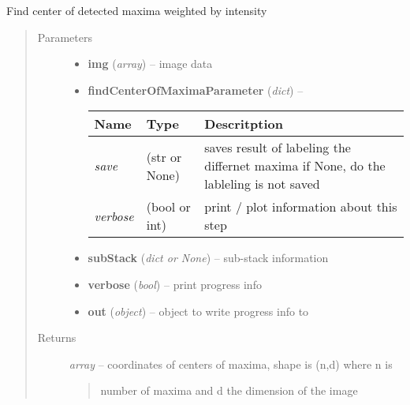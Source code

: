 \documentclass[letterpaper,10pt,english]{sphinxmanual}
\begin{document}
\begin{fulllineitems}
\label{api/ClearMap.ImageProcessing:ClearMap.ImageProcessing.MaximaDetection.findCenterOfMaxima}
Find center of detected maxima weighted by intensity
\begin{quote}\begin{description}
\item[{Parameters}] \leavevmode\begin{itemize}
\item {} 
\textbf{img} (\emph{array}) --
image data

\item {} 
\textbf{findCenterOfMaximaParameter} (\emph{dict}) --

\begin{tabulary}{\linewidth}{|L|L|L|}
\hline
\textsf{\relax 
Name
} & \textsf{\relax 
Type
} & \textsf{\relax 
Descritption
}\\
\hline
\emph{save}
 & 
(str or None)
 & 
saves result of labeling the differnet maxima
if None, do the lableling is not saved
\\
\hline
\emph{verbose}
 & 
(bool or int)
 & 
print / plot information about this step
\\
\hline\end{tabulary}


\item {} 
\textbf{subStack} (\emph{dict or None}) --
sub-stack information

\item {} 
\textbf{verbose} (\emph{bool}) --
print progress info

\item {} 
\textbf{out} (\emph{object}) --
object to write progress info to

\end{itemize}

\item[{Returns}] \leavevmode

\emph{array} --
coordinates of centers of maxima, shape is (n,d) where n is
\begin{quote}

number of maxima and d the dimension of the image
\end{quote}


\end{description}\end{quote}

\end{fulllineitems}
\end{document}
